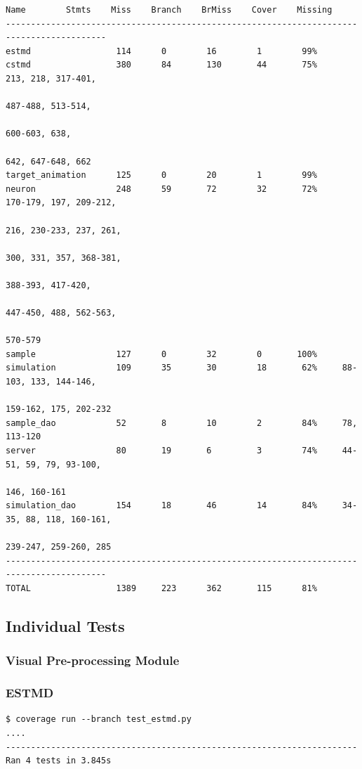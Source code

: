 \documentclass[a4paper,11pt]{article}
\begin{document}
\begin{appendices}
\begin{verbatim}
Name 		Stmts    Miss    Branch    BrMiss    Cover    Missing
------------------------------------------------------------------------------------------
estmd                 114      0        16        1        99%   
cstmd                 380      84       130       44       75%     213, 218, 317-401,
                                                                   487-488, 513-514,
                                                                   600-603, 638,
                                                                   642, 647-648, 662
target_animation      125      0        20        1        99%   
neuron                248      59       72        32       72%     170-179, 197, 209-212,
                                                                   216, 230-233, 237, 261,
                                                                   300, 331, 357, 368-381,
                                                                   388-393, 417-420,
                                                                   447-450, 488, 562-563,
                                                                   570-579
sample                127      0        32        0       100%   
simulation            109      35       30        18       62%     88-103, 133, 144-146,
                                                                   159-162, 175, 202-232
sample_dao            52       8        10        2        84%     78, 113-120
server                80       19       6         3        74%     44-51, 59, 79, 93-100,
                                                                   146, 160-161
simulation_dao        154      18       46        14       84%     34-35, 88, 118, 160-161,
                                                                   239-247, 259-260, 285
------------------------------------------------------------------------------------------
TOTAL                 1389     223      362       115      81%  
\end{verbatim}

\subsection{Individual Tests}
\subsubsection{Visual Pre-processing Module}
\subsubsection*{ESTMD}
\begin{verbatim}
$ coverage run --branch test_estmd.py
....
----------------------------------------------------------------------
Ran 4 tests in 3.845s


\end{verbatim}
\end{appendices}
\end{document}
